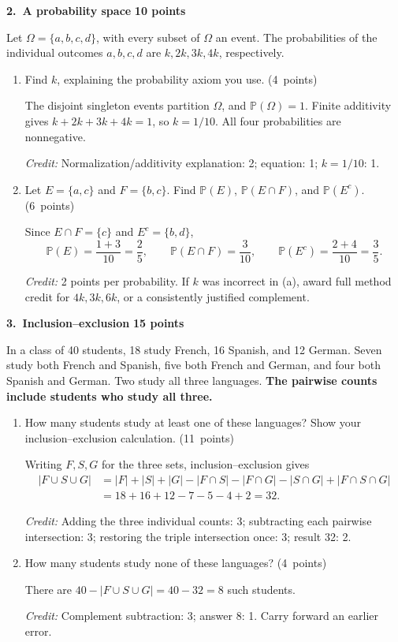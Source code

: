\documentclass[11pt,letterpaper]{article}
\newcommand{\Prob}{\mathbb P}
\newcommand{\partpts}[1]{\unskip\nobreak\hspace{.3em}%
  \mbox{\small\color{muted}(#1 points)}}
\newcommand{\credit}[1]{\par{\footnotesize\color{muted}\textit{Credit:} #1}}
\newcommand{\problem}[3]{\par\addvspace{9pt}%
  {\large\bfseries\color{indigo}#1.\ #2}\hfill
  {\small\color{muted}\textbf{#3 points}}\par\nobreak}
\begin{document}
\problem{2}{A probability space}{10}
Let $\Omega=\{a,b,c,d\}$, with every subset of $\Omega$ an event.
The probabilities of the individual outcomes $a,b,c,d$ are
$k,2k,3k,4k$, respectively.
\begin{enumerate}
\item Find $k$, explaining the probability axiom you use.
\partpts{4}
\begin{solution}[.6in]
The disjoint singleton events partition $\Omega$, and $\Prob(\Omega)=1$.
Finite additivity gives $k+2k+3k+4k=1$, so $k=1/10$.
All four probabilities are nonnegative.
\credit{Normalization/additivity explanation: 2; equation: 1; $k=1/10$: 1.}
\end{solution}
\item Let $E=\{a,c\}$ and $F=\{b,c\}$.
Find $\Prob(E)$, $\Prob(E\cap F)$, and $\Prob(E^c)$.
\partpts{6}
\begin{solution}[.85in]
Since $E\cap F=\{c\}$ and $E^c=\{b,d\}$,
\[
\Prob(E)=\frac{1+3}{10}=\frac25,\qquad
\Prob(E\cap F)=\frac3{10},\qquad
\Prob(E^c)=\frac{2+4}{10}=\frac35.
\]
\credit{2 points per probability. If $k$ was incorrect in (a), award full
method credit for $4k,3k,6k$, or a consistently justified complement.}
\end{solution}
\end{enumerate}

\newpage
\problem{3}{Inclusion--exclusion}{15}
In a class of 40 students, 18 study French, 16 Spanish, and 12 German.
Seven study both French and Spanish, five both French and German,
and four both Spanish and German. Two study all three languages.
\textbf{The pairwise counts include students who study all three.}
\begin{enumerate}
\item How many students study at least one of these languages?
Show your inclusion--exclusion calculation. \partpts{11}
\begin{solution}[.95in]
Writing $F,S,G$ for the three sets, inclusion--exclusion gives
\begin{align*}
|F\cup S\cup G|
&=|F|+|S|+|G|-|F\cap S|-|F\cap G|-|S\cap G|
  +|F\cap S\cap G|\\
&=18+16+12-7-5-4+2=32.
\end{align*}
\credit{Adding the three individual counts: 3; subtracting each pairwise
intersection: 3; restoring the triple intersection once: 3; result 32: 2.}
\end{solution}
\item How many students study none of these languages? \partpts{4}
\begin{solution}[.65in]
There are $40-|F\cup S\cup G|=40-32=8$ such students.
\credit{Complement subtraction: 3; answer 8: 1. Carry forward an earlier error.}
\end{solution}
\end{enumerate}
\end{document}
